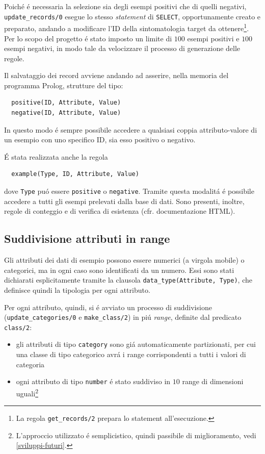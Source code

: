 \documentclass[preprint]{acm_proc_article-sp}
\begin{document}
Poich\'e \'e necessaria la selezione sia degli esempi positivi che di quelli negativi, \verb|update_records/0| esegue lo stesso \textit{statement} di \texttt{SELECT}, opportunamente creato e preparato, andando a modificare l'ID della sintomatologia target da ottenere\footnote{La regola \verb|get_records/2| prepara lo statement all'esecuzione.}. Per lo scopo del progetto \'e stato imposto un limite di $100$ esempi positivi e $100$ esempi negativi, in modo tale da velocizzare il processo di generazione delle regole.

Il salvataggio dei record avviene andando ad asserire, nella memoria del programma Prolog, strutture del tipo:
\begin{verbatim}
  positive(ID, Attribute, Value)
  negative(ID, Attribute, Value)
\end{verbatim}
In questo modo \'e sempre possibile accedere a qualsiasi coppia attributo-valore di un esempio con uno specifico ID, sia esso positivo o negativo.

\'E stata realizzata anche la regola
\begin{verbatim}
  example(Type, ID, Attribute, Value)
\end{verbatim}
dove \verb|Type| pu\'o essere \verb|positive| o \verb|negative|. Tramite questa modalit\'a \'e possibile accedere a tutti gli esempi prelevati dalla base di dati. Sono presenti, inoltre, regole di conteggio e di verifica di esistenza (cfr. documentazione HTML).

\subsection{Suddivisione attributi in range}
\label{prolog-categories}
Gli attributi dei dati di esempio possono essere numerici (a virgola mobile) o categorici, ma in ogni caso sono identificati da un numero. Essi sono stati dichiarati esplicitamente tramite la clausola \verb|data_type(Attribute, Type)|, che definisce quindi la tipologia per ogni attributo.

Per ogni attributo, quindi, si \'e avviato un processo di suddivisione (\verb|update_categories/0| e \verb|make_class/2|) in pi\'u \textit{range}, definite dal predicato \verb|class/2|:
\begin{itemize}
\item gli attributi di tipo \verb|category| sono gi\'a automaticamente partizionati, per cui una classe di tipo categorico avr\'a i range corrispondenti a tutti i valori di categoria
\item ogni attributo di tipo \verb|number| \'e stato suddiviso in $10$ range di dimensioni uguali\footnote{L'approccio utilizzato \'e semplicistico, quindi passibile di miglioramento, vedi \ref{sviluppi-futuri}.}
\end{itemize}
\end{document}
